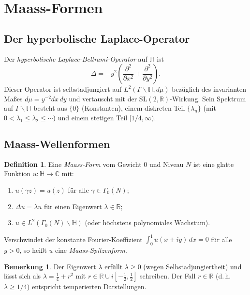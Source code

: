 \documentclass[12pt,a4paper]{amsart}
\theoremstyle{definition}
\newtheorem{definition}[theorem]{Definition}
\newtheorem{bemerkung}[theorem]{Bemerkung}
\newcommand{\HH}{\mathbb{H}}
\newcommand{\RR}{\mathbb{R}}
\newcommand{\CC}{\mathbb{C}}
\newcommand{\SL}{\mathrm{SL}}
\begin{document}
\section{Maass-Formen}
\label{sec:maass}

\subsection{Der hyperbolische Laplace-Operator}

Der \emph{hyperbolische Laplace-Beltrami-Operator} auf $\HH$ ist
\[
\Delta = -y^2 \!\left(\frac{\partial^2}{\partial x^2} + \frac{\partial^2}{\partial y^2}\right).
\]
Dieser Operator ist selbstadjungiert auf $L^2(\Gamma \backslash \HH, d\mu)$
bezüglich des invarianten Maßes $d\mu = y^{-2} dx\, dy$ und vertauscht mit der
$\SL(2,\RR)$-Wirkung. Sein Spektrum auf $\Gamma \backslash \HH$ besteht aus
$\{0\}$ (Konstanten), einem diskreten Teil $\{\lambda_n\}$ (mit
$0 < \lambda_1 \leq \lambda_2 \leq \cdots$) und einem stetigen Teil $[1/4, \infty)$.

\subsection{Maass-Wellenformen}

\begin{definition}
Eine \emph{Maass-Form} vom Gewicht $0$ und Niveau $N$ ist eine glatte Funktion
$u : \HH \to \CC$ mit:
\begin{enumerate}[label=(\roman*)]
\item $u(\gamma z) = u(z)$ für alle $\gamma \in \Gamma_0(N)$;
\item $\Delta u = \lambda u$ für einen Eigenwert $\lambda \in \RR$;
\item $u \in L^2(\Gamma_0(N) \backslash \HH)$ (oder höchstens polynomiales Wachstum).
\end{enumerate}
Verschwindet der konstante Fourier-Koeffizient $\int_0^1 u(x+iy)\, dx = 0$ für alle
$y > 0$, so heißt $u$ eine \emph{Maass-Spitzenform}.
\end{definition}

\begin{bemerkung}
Der Eigenwert $\lambda$ erfüllt $\lambda \geq 0$ (wegen Selbstadjungiertheit) und
lässt sich als $\lambda = \frac{1}{4} + r^2$ mit $r \in \RR \cup i[-\tfrac{1}{2}, \tfrac{1}{2}]$
schreiben. Der Fall $r \in \RR$ (d.\,h.\ $\lambda \geq 1/4$) entspricht temperierten Darstellungen.
\end{bemerkung}
\end{document}
